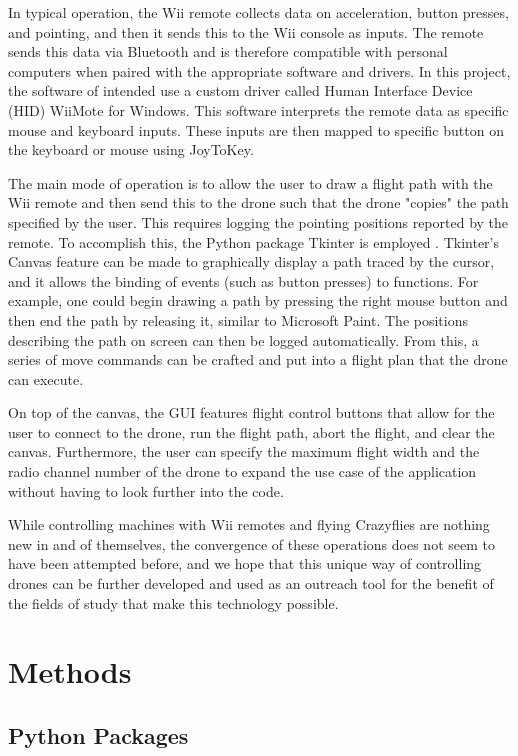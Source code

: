 \documentclass[conf]{new-aiaa}
\begin{document}
    In typical operation, the Wii remote collects data on acceleration, button presses, and pointing, and then it sends this to the Wii console as inputs. The remote sends this data via Bluetooth and is therefore compatible with personal computers when paired with the appropriate software and drivers. In this project, the software of intended use a custom driver called Human Interface Device (HID) WiiMote for Windows. This software interprets the remote data as specific mouse and keyboard inputs. These inputs are then mapped to specific button on the keyboard or mouse using JoyToKey.
    
    The main mode of operation is to allow the user to draw a flight path with the Wii remote and then send this to the drone such that the drone "copies" the path specified by the user. This requires logging the pointing positions reported by the remote. To accomplish this, the Python package Tkinter is employed \cite{tkinter}. Tkinter's Canvas feature can be made to graphically display a path traced by the cursor, and it allows the binding of events (such as button presses) to functions. For example, one could begin drawing a path by pressing the right mouse button and then end the path by releasing it, similar to Microsoft Paint. The positions describing the path on screen can then be logged automatically. From this, a series of move commands can be crafted and put into a flight plan that the drone can execute.

    On top of the canvas, the GUI features flight control buttons that allow for the user to connect to the drone, run the flight path, abort the flight, and clear the canvas. Furthermore, the user can specify the maximum flight width and the radio channel number of the drone to expand the use case of the application without having to look further into the code. 
    
    While controlling machines with Wii remotes and flying Crazyflies are nothing new in and of themselves, the convergence of these operations does not seem to have been attempted before, and we hope that this unique way of controlling drones can be further developed and used as an outreach tool for the benefit of the fields of study that make this technology possible.

\section{Methods}

    \subsection{Python Packages}
        
\end{document}
